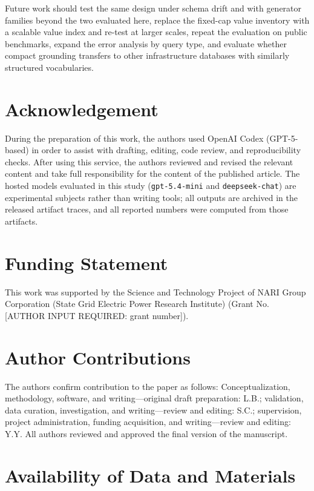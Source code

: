 \documentclass{article}
\begin{document}
Future work should test the same design under schema drift and with generator families beyond the two evaluated here, replace the fixed-cap value inventory with a scalable value index and re-test at larger scales, repeat the evaluation on public benchmarks, expand the error analysis by query type, and evaluate whether compact grounding transfers to other infrastructure databases with similarly structured vocabularies.

\section*{Acknowledgement}

During the preparation of this work, the authors used OpenAI Codex (GPT-5-based) in order to assist with drafting, editing, code review, and reproducibility checks. After using this service, the authors reviewed and revised the relevant content and take full responsibility for the content of the published article. The hosted models evaluated in this study (\texttt{gpt-5.4-mini} and \texttt{deepseek-chat}) are experimental subjects rather than writing tools; all outputs are archived in the released artifact traces, and all reported numbers were computed from those artifacts.
\section*{Funding Statement}

This work was supported by the Science and Technology Project of NARI Group Corporation (State Grid Electric Power Research Institute) (Grant No. [AUTHOR INPUT REQUIRED: grant number]).
\section*{Author Contributions}

The authors confirm contribution to the paper as follows: Conceptualization, methodology, software, and writing---original draft preparation: L.B.; validation, data curation, investigation, and writing---review and editing: S.C.; supervision, project administration, funding acquisition, and writing---review and editing: Y.Y. All authors reviewed and approved the final version of the manuscript.
\section*{Availability of Data and Materials}
\end{document}
